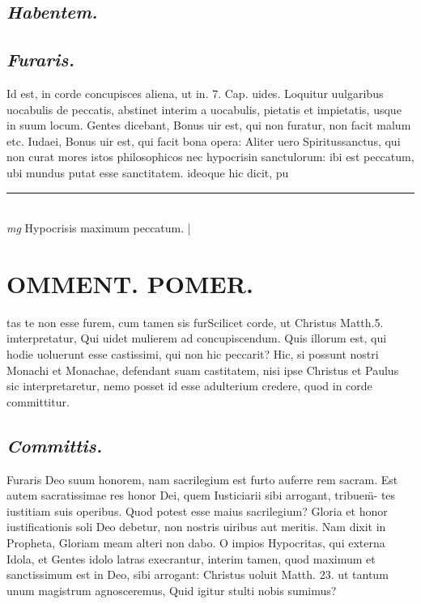 \documentclass{article}
\begin{document}
\begin{pages}
\subsection*{\textit{Habentem. }}
{}
\subsection*{\textit{Furaris. }}\pstart Id est, in corde concupisces aliena, ut in. 7. Cap.  uides. Loquitur uulgaribus uocabulis de peccatis, abstinet interim a uocabulis, pietatis et impietatis, usque in suum locum. Gentes dicebant, Bonus uir est, qui non furatur, non facit malum etc. Iudaei, Bonus uir est, qui facit bona opera: Aliter uero Spiritussanctus, qui non curat mores istos philosophicos nec hypocrisin sanctulorum: ibi est peccatum, ubi mundus putat esse sanctitatem. ideoque hic dicit, pu\pend
\vspace{0.5cm}\noindent
\vspace{0.2cm}\rule{1cm}{0.2pt}\\ 
\hspace{0.2cm}\textit{mg}
\footnotesize Hypocrisis maximum peccatum.  
\normalsize| 
\section*{OMMENT. POMER.  }\pstart tas te non esse furem, cum tamen sis fur\pend\pstart Scilicet corde, ut Christus Matth.5. imterpretatur, Qui uidet mulierem ad concupiscendum. Quis illorum est, qui hodie uoluerunt esse castissimi, qui non hic peccarit? Hic, si possunt nostri Monachi et Monachae, defendant suam castitatem, nisi ipse Christus et Paulus sic interpretaretur, nemo posset id esse adulterium credere, quod in corde committitur.   \pend
{}
{}
\subsection*{\textit{Committis. }}\pstart Furaris Deo suum honorem, nam sacrilegium est furto auferre rem sacram. Est autem sacratissimae res honor Dei, quem Iusticiarii sibi arrogant, tribuem̈- tes iustitiam suis operibus. Quod potest esse maius sacrilegium? Gloria et honor iustificationis soli Deo debetur, non nostris uiribus aut meritis. Nam dixit in Propheta, Gloriam meam alteri non dabo. O impios Hypocritas, qui externa Idola, et Gentes idolo latras execrantur, interim tamen, quod maximum et sanctissimum est in Deo, sibi arrogant: Christus uoluit Matth. 23. ut tantum unum magistrum agnosceremus, Quid igitur stulti nobis sumimus?  \pend
{}
{}

\end{pages}
\end{document}
